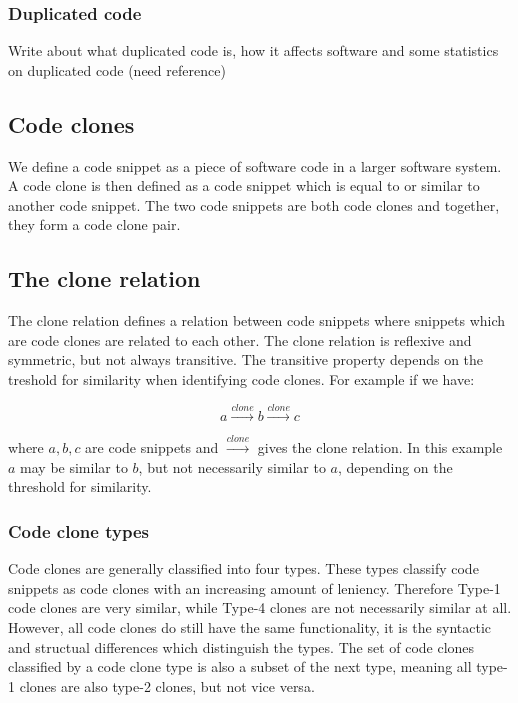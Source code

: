 \documentclass[12pt]{article}
\begin{document}
\subsubsection{Duplicated code}

Write about what duplicated code is, how it affects software and some statistics on
duplicated code (need reference)

\subsection{Code clones}

We define a code snippet as a piece of software code in a larger software system. A code
clone is then defined as a code snippet which is equal to or similar to another code
snippet. The two code snippets are both code clones and together, they form a code clone
pair. 

\subsection{The clone relation}
The clone relation defines a relation between code snippets where snippets which are
code clones are related to each other. The clone relation is reflexive and symmetric, but
not always transitive. The transitive property depends on the treshold for similarity when
identifying code clones. For example if we have:

$$a \xrightarrow{clone} b \xrightarrow{clone} c$$

where $a,b,c$ are code snippets and $\xrightarrow{clone}$ gives the clone relation. In
this example $a$ may be similar to $b$, but not necessarily similar to $a$, depending on
the threshold for similarity.

\subsubsection{Code clone types}

Code clones are generally classified into four types.\cite{Inoue_introduction_to_cc} These
types classify code snippets as code clones with an increasing amount of leniency.
Therefore Type-1 code clones are very similar, while Type-4 clones are not necessarily
similar at all. However, all code clones do still have the same functionality, it is the
syntactic and structual differences which distinguish the types. The set of code clones
classified by a code clone type is also a subset of the next type, meaning all type-1
clones are also type-2 clones, but not vice versa.
\end{document}
